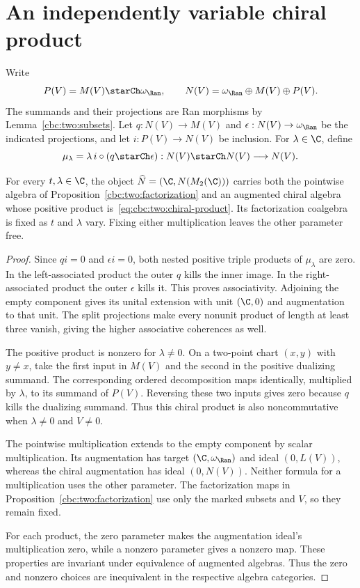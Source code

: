 \section{An independently variable chiral product}
Write
\[
 P(V)=M(V)\starCh\omega_{\Ran},\qquad
 N(V)=\omega_{\Ran}\oplus M(V)\oplus P(V).
\]
The summands and their projections are Ran morphisms by
Lemma~\ref{cbc:two:subsets}.
Let $q:N(V)\to M(V)$ and $\epsilon:N(V)\to\omega_{\Ran}$
be the indicated projections, and let $i:P(V)\to N(V)$ be inclusion.
For $\lambda\in\C$, define
\begin{equation}
 \mu_\lambda=\lambda\,i\circ(q\starCh\epsilon):
 N(V)\starCh N(V)\longrightarrow N(V).
 \label{eq:cbc:two:chiral-product}
\end{equation}

\begin{theorem}
\label{cbc:two:independence}
For every $t,\lambda\in\C$, the object
$\widehat N=(\C,N(M_2(\C)))$ carries both the pointwise algebra
of Proposition~\ref{cbc:two:factorization} and an augmented chiral algebra
whose positive product is~\eqref{eq:cbc:two:chiral-product}.
Its factorization coalgebra is fixed as $t$ and $\lambda$ vary.
Fixing either multiplication leaves the other parameter free.
\end{theorem}
\begin{proof}
Since $qi=0$ and $\epsilon i=0$, both nested positive triple products
of $\mu_\lambda$ are zero.
In the left-associated product the outer $q$ kills the inner image.
In the right-associated product the outer $\epsilon$ kills it.
This proves associativity. Adjoining the empty component gives its
unital extension with unit $(\C,0)$ and augmentation to that unit.
The split projections make every nonunit product of length at least
three vanish, giving the higher associative coherences as well.

The positive product is nonzero for $\lambda\ne0$.
On a two-point chart $(x,y)$ with $y\ne x$, take the first input
in $M(V)$ and the second in the positive dualizing summand.
The corresponding ordered decomposition maps identically, multiplied
by $\lambda$, to its summand of $P(V)$.
Reversing these two inputs gives zero because $q$ kills the dualizing
summand. Thus this chiral product is also noncommutative when
$\lambda\ne0$ and $V\ne0$.

The pointwise multiplication extends to the empty component by scalar
multiplication. Its augmentation has target $(\C,\omega_{\Ran})$
and ideal $(0,L(V))$, whereas the chiral augmentation has ideal
$(0,N(V))$.
Neither formula for a multiplication uses the other parameter.
The factorization maps in Proposition~\ref{cbc:two:factorization}
use only the marked subsets and $V$, so they remain fixed.

For each product, the zero parameter makes the augmentation ideal's
multiplication zero, while a nonzero parameter gives a nonzero map.
These properties are invariant under equivalence of augmented algebras.
Thus the zero and nonzero choices are inequivalent in the respective
algebra categories.
\end{proof}

